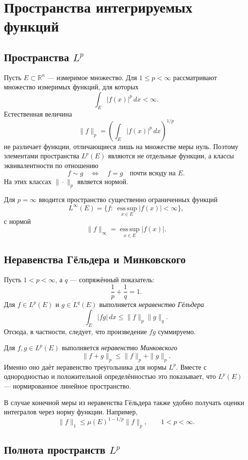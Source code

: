 \section{Пространства интегрируемых функций}
\label{sec:integrable-function-spaces}

\subsection[Пространства Lp]{Пространства $L^p$}

Пусть $E\subset\mathbb R^n$ --- измеримое множество. Для
$1\leq p<\infty$ рассматривают множество измеримых функций, для которых
\[
    \int_E |f(x)|^p\,dx<\infty.
\]
Естественная величина
\[
    \|f\|_p=
    \left(\int_E|f(x)|^p\,dx\right)^{1/p}
\]
не различает функции, отличающиеся лишь на множестве меры нуль. Поэтому
элементами пространства $L^p(E)$ являются не отдельные функции, а классы
эквивалентности по отношению
\[
    f\sim g\quad\Longleftrightarrow\quad f=g\quad\text{почти всюду на }E.
\]
На этих классах $\|\cdot\|_p$ является нормой.

Для $p=\infty$ вводится пространство существенно ограниченных функций
\[
    L^\infty(E)=\{f:\ \operatorname*{ess\,sup}_{x\in E}|f(x)|<\infty\},
\]
с нормой
\[
    \|f\|_\infty=\operatorname*{ess\,sup}_{x\in E}|f(x)|.
\]

\subsection{Неравенства Гёльдера и Минковского}

Пусть $1<p<\infty$, а $q$ --- сопряжённый показатель:
\[
    \frac1p+\frac1q=1.
\]
Для $f\in L^p(E)$ и $g\in L^q(E)$ выполняется \emph{неравенство Гёльдера}
\[
    \int_E|fg|\,dx
    \leq \|f\|_p\|g\|_q.
\]
Отсюда, в частности, следует, что произведение $fg$ суммируемо.

Для $f,g\in L^p(E)$ выполняется \emph{неравенство Минковского}
\[
    \|f+g\|_p\leq\|f\|_p+\|g\|_p.
\]
Именно оно даёт неравенство треугольника для нормы $L^p$. Вместе с
однородностью и положительной определённостью это показывает, что $L^p(E)$ ---
нормированное линейное пространство.

В случае конечной меры из неравенства Гёльдера также удобно получать оценки
интегралов через норму функции. Например,
\[
    \|f\|_1\leq \mu(E)^{1-1/p}\|f\|_p,
    \qquad 1<p<\infty.
\]

\subsection[Полнота пространств Lp]{Полнота пространств $L^p$}

